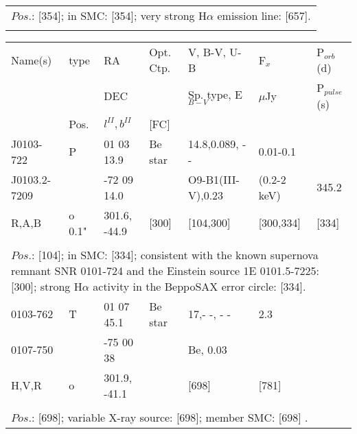 \documentclass{aa}
\begin{document}
\begin{table*}[h]
\begin{tabular}{p{2.5cm}p{1cm}p{1.8cm}p{2.3cm}p{3.3cm}p{2.0cm}p{2.2cm}}
\\
\multicolumn{7}{p{17.5cm}}{
$Pos$.: [354]; in SMC: [354]; very strong H$\alpha $ emission line: [657].      }\\

\noalign{\smallskip}
\hline
\end{tabular}
\end{table*}

\clearpage\begin{table*}[h]
\begin{tabular}{p{2.5cm}p{1cm}p{1.8cm}p{2.3cm}p{3.3cm}p{2.0cm}p{2.2cm}}
\noalign{\smallskip}
\multicolumn{7}{p{17.5cm}}{Table 1.  (continued) }\\        
\hline
\noalign{\smallskip}
Name(s)      & type  & RA                       &  Opt. Ctp. & V, B-V, U-B                    &   F$_{x}$           & P$_{orb}$(d)    \\
                      &            &  DEC                   &                     &  Sp. type, E$_{B-V}$  &    $\mu$Jy         & P$_{pulse}$(s) \\
                      & Pos.  &  $l^{II}, b^{II}$     &  [FC]           &                                          &                            &                             \\

\noalign{\smallskip}
\hline
\noalign{\smallskip}
J0103-722         &   P         &  01 03 13.9      &    Be star  &   14.8,0.089, - -         &  0.01-0.1          &             \\                   
J0103.2-7209   &               &    -72 09 14.0  &                     &   O9-B1(III-V),0.23  & (0.2-2 keV)      &  345.2  \\
 R,A,B                &  o 0.1"  & 301.6, -44.9     &   [300]         &    [104,300]               &    [300,334]      &   [334]  \\
  
 \\
\multicolumn{7}{p{17.5cm}}{
$Pos$.: [104]; in SMC: [334]; consistent with the known supernova remnant SNR 0101-724 and the Einstein
source 1E 0101.5-7225: [300]; strong H$\alpha $ activity in the BeppoSAX error circle: [334].  }\\

\noalign{\smallskip}
\hline
\noalign{\smallskip}
0103-762      &   T      & 01 07 45.1           & Be star       & 17,- -, - -                      &    2.3                  &                              \\
0107-750      &           & -75 00 38              &                      & Be, 0.03                     &                            &                              \\
H,V,R            &  o       & 301.9, -41.1         &                      &    [698]                      &        [781]         &                              \\
\\
\multicolumn{7}{p{17.5cm}}{
$Pos$.: [698]; variable X-ray source: [698]; member SMC: [698] .}\\


\end{tabular}
\end{table*}
\end{document}
